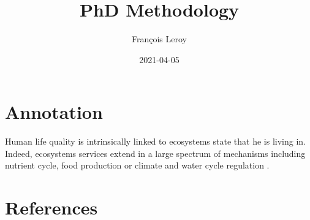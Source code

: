 \documentclass[
  12pt,
  oneside]{report}
\title{PhD Methodology}
\author{François Leroy}
\date{2021-04-05}
\begin{document}
\maketitle


\cleardoublepage 
{}

{
\setcounter{tocdepth}{1}
\tableofcontents
}
\listoffigures
\listoftables
{}


\cleardoublepage 
{}


\hypertarget{annotation}{%
\chapter{Annotation}\label{annotation}}

Human life quality is intrinsically linked to ecosystems state that he is living in. Indeed, ecosystems services extend in a large spectrum of mechanisms including nutrient cycle, food production or climate and water cycle regulation \autocite{pereira_global_2012}.


\singlespacing %
\chapter{References}\label{references}
{
\renewcommand{\clearpage}{}
\printbibliography[heading=none] %
}
\end{document}
